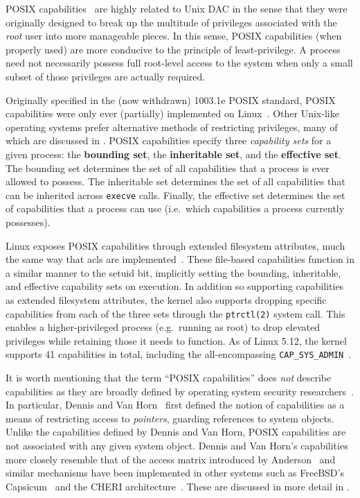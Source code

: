 POSIX capabilities~\cite{posix_capabilities, corbet2006_capabities_a,
corbet2006_capabities_b} are highly related to Unix DAC in the sense that they were
originally designed to break up the multitude of privileges associated with the
\textit{root} user into more manageable pieces. In this sense, POSIX capabilities (when
properly used) are more conducive to the principle of least-privilege. A process need not
necessarily possess full root-level access to the system when only a small subset of those
privileges are actually required.

Originally specified in the (now withdrawn) 1003.1e POSIX standard, POSIX capabilities
were only ever (partially) implemented on Linux~\cite{anderson2017_comparison}. Other
Unix-like operating systems prefer alternative methods of restricting privileges, many of
which are discussed in . POSIX capabilities specify three
\textit{capability sets} for a given process: the \textbf{bounding set}, the
\textbf{inheritable set}, and the \textbf{effective set}. The bounding set determines the
set of all capabilities that a process is ever allowed to possess. The inheritable set
determines the set of all capabilities that can be inherited across \texttt{execve} calls.
Finally, the effective set determines the set of capabilities that a process can use
(i.e.~which capabilities a process currently possesses).

Linux exposes POSIX capabilities through extended filesystem attributes, much the same way
that \glspl{acl} are implemented~\cite{corbet2006_capabities_b}. These file-based
capabilities function in a similar manner to the setuid bit, implicitly setting the
bounding, inheritable, and effective capability sets on execution. In addition so
supporting capabilities as extended filesystem attributes, the kernel also supports
dropping specific capabilities from each of the three sets through the \texttt{ptrctl(2)}
system call. This enables a higher-privileged process (e.g.~running as root) to drop
elevated privileges while retaining those it needs to function. As of Linux 5.12, the
kernel supports 41 capabilities in total, including the all-encompassing
\texttt{CAP\_SYS\_ADMIN}~\cite{linux_capability_h}.

It is worth mentioning that the term \enquote{POSIX capabilities} does \textit{not}
describe capabilities as they are broadly defined by operating system security
researchers~\cite{anderson2017_comparison}. In particular, Dennis and Van
Horn~\cite{dennis1966_semantics} first defined the notion of capabilities as a means of
restricting access to \textit{pointers}, guarding references to system objects. Unlike the
capabilities defined by Dennis and Van Horn, POSIX capabilities are not associated with
any given system object. Dennis and Van Horn's capabilities more closely resemble that of
the access matrix introduced by Anderson~\cite{anderson1972_report} and similar mechanisms
have been implemented in other systems such as FreeBSD's
Capsicum~\cite{watson2010_capsicum} and the CHERI architecture~\cite{watson2015_cheri,
davis2019_cheriabi}. These are discussed in more detail in .

